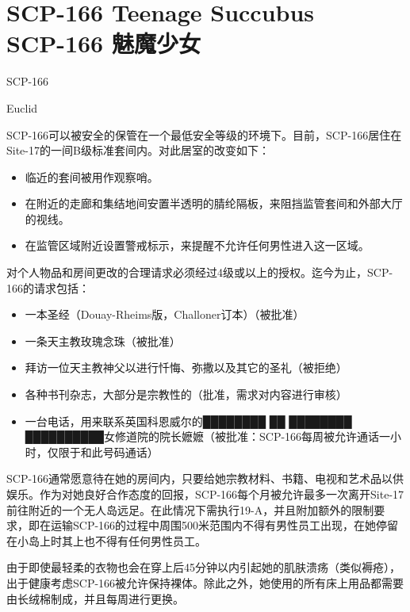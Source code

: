 \chapter[SCP-166 魅魔少女]{
    SCP-166 Teenage Succubus\\
    SCP-166 魅魔少女
}

\label{chap:SCP-166}

 SCP-166

 Euclid

 SCP-166可以被安全的保管在一个最低安全等级的环境下。目前，SCP-166居住在Site-17的一间B级标准套间内。对此居室的改变如下：

\begin{itemize}
\item 临近的套间被用作观察哨。
\item 在附近的走廊和集结地间安置半透明的腈纶隔板，来阻挡监管套间和外部大厅的视线。
\item 在监管区域附近设置警戒标示，来提醒不允许任何男性进入这一区域。
\end{itemize}

对个人物品和房间更改的合理请求必须经过4级或以上的授权。迄今为止，SCP-166的请求包括：

\begin{itemize}
\item 一本圣经（Douay-Rheims版，Challoner订本）（被批准）
\item 一条天主教玫瑰念珠（被批准）
\item 拜访一位天主教神父以进行忏悔、弥撒以及其它的圣礼（被拒绝）
\item 各种书刊杂志，大部分是宗教性的（批准，需求对内容进行审核）
\item 一台电话，用来联系英国科恩威尔的████████ ██ ████████ ██████████女修道院的院长嬷嬷（被批准：SCP-166每周被允许通话一小时，仅限于和此号码通话）
\end{itemize}

SCP-166通常愿意待在她的房间内，只要给她宗教材料、书籍、电视和艺术品以供娱乐。作为对她良好合作态度的回报，SCP-166每个月被允许最多一次离开Site-17前往附近的一个无人岛远足。在此情况下需执行19-A，并且附加额外的限制要求，即在运输SCP-166的过程中周围500米范围内不得有男性员工出现，在她停留在小岛上时其上也不得有任何男性员工。

由于即使最轻柔的衣物也会在穿上后45分钟以内引起她的肌肤溃疡（类似褥疮）， 出于健康考虑SCP-166被允许保持裸体。除此之外，她使用的所有床上用品都需要由长绒棉制成，并且每周进行更换。

